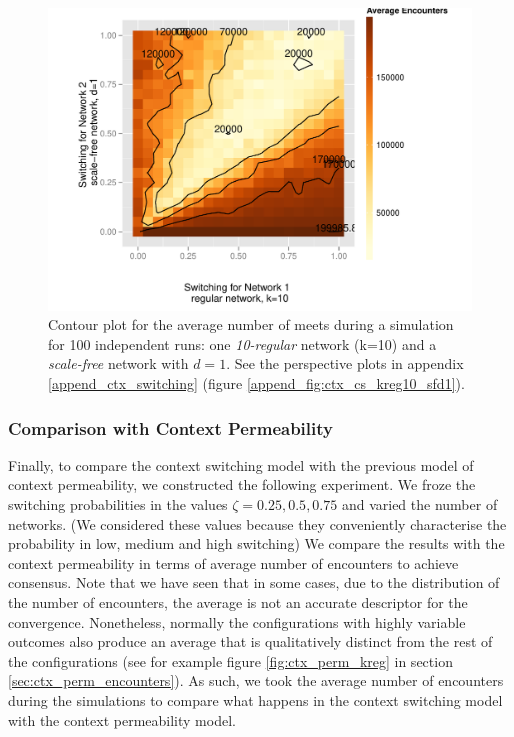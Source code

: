 \documentclass[preprint,number]{elsarticle}
\begin{document}
\begin{figure}[H]
	\centering
	\includegraphics[width=1\linewidth]{"../analysis/pdf/context_switching_1_10regular_1_scale-free_d1_switching_contour"}
	\begin{minipage}{0.9\textwidth}
		\caption{Contour plot for the average number of meets during a simulation for 100 independent runs: one \textit{10-regular} network (k=10) and a \textit{scale-free} network with $d=1$. See the perspective plots in  appendix \ref{append_ctx_switching} (figure \ref{append_fig:ctx_cs_kreg10_sfd1}).
		}
		\label{fig:ctx_cs_kreg10_sfd1}
	\end{minipage}
\end{figure}


\subsubsection{Comparison with Context Permeability}
\noindent Finally, to compare the context switching model with the previous model of context permeability, we constructed the following experiment. We froze the switching probabilities in the values $\zeta={0.25,0.5,0.75}$ and varied the number of networks. (We considered these values because they conveniently characterise the probability in low, medium and high switching) We compare the results with the context permeability in terms of average number of encounters to achieve consensus. Note that we have seen that in some cases, due to the distribution of the number of encounters, the average is not an accurate descriptor for the convergence. Nonetheless, normally the configurations with highly variable outcomes also produce an average that is qualitatively distinct from the rest of the configurations (see for example figure \ref{fig:ctx_perm_kreg} in section \ref{sec:ctx_perm_encounters}). As such, we took the average number of encounters during the simulations to compare what happens in the context switching model with the context permeability model.
\end{document}
